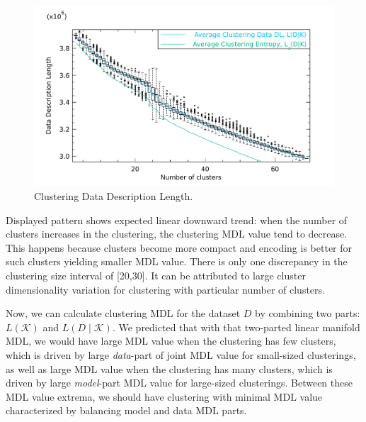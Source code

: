 \begin{figure}[H]
\center
\includegraphics[width=5.0in]{img/mdl-clust_clustering-data-dl_1.pdf}
\caption{Clustering Data Description Length.}
\label{fig:clustering-data-dl}
\end{figure}



Displayed pattern shows expected linear downward trend: when the number of
clusters increases in the clustering, the clustering MDL value tend to decrease.
This happens because clusters become more compact and encoding is better for
such clusters yielding smaller MDL value. There is only one discrepancy in
the clustering size interval of [20,30]. It can be attributed to large cluster
dimensionality variation for clustering with particular number of clusters.

Now, we can calculate clustering MDL for the dataset $D$ by combining two parts:
$L(\mathcal{K})$ and $L(D \;|\;\mathcal{K})$.
We predicted that with that two-parted linear manifold MDL, we would have
large MDL value when the clustering has few clusters, which is driven by large
\emph{data}-part of joint MDL value for small-sized clusterings,
as well as large MDL value when the clustering has many clusters, which is
driven by large \emph{model}-part MDL value for large-sized clusterings.
Between these MDL value extrema, we should have clustering with minimal MDL
value characterized by balancing model and data MDL parts.

